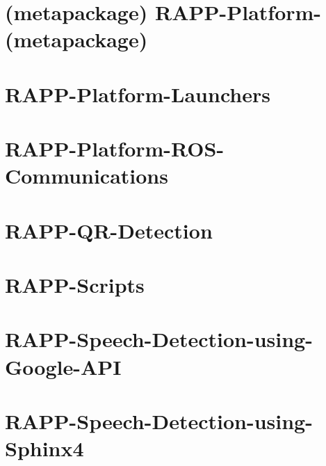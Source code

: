 \documentclass[twoside]{book}
\begin{document}
\chapter{(metapackage) R\-A\-P\-P-\/\-Platform-\/(metapackage)}
\label{md_rapp-platform_8wiki_RAPP-Platform-}
\hypertarget{md_rapp-platform_8wiki_RAPP-Platform-}{}

\chapter{R\-A\-P\-P-\/\-Platform-\/\-Launchers}
\label{md_rapp-platform_8wiki_RAPP-Platform-Launchers}
\hypertarget{md_rapp-platform_8wiki_RAPP-Platform-Launchers}{}

\chapter{R\-A\-P\-P-\/\-Platform-\/\-R\-O\-S-\/\-Communications}
\label{md_rapp-platform_8wiki_RAPP-Platform-ROS-Communications}
\hypertarget{md_rapp-platform_8wiki_RAPP-Platform-ROS-Communications}{}

\chapter{R\-A\-P\-P-\/\-Q\-R-\/\-Detection}
\label{md_rapp-platform_8wiki_RAPP-QR-Detection}
\hypertarget{md_rapp-platform_8wiki_RAPP-QR-Detection}{}

\chapter{R\-A\-P\-P-\/\-Scripts}
\label{md_rapp-platform_8wiki_RAPP-Scripts}
\hypertarget{md_rapp-platform_8wiki_RAPP-Scripts}{}

\chapter{R\-A\-P\-P-\/\-Speech-\/\-Detection-\/using-\/\-Google-\/\-A\-P\-I}
\label{md_rapp-platform_8wiki_RAPP-Speech-Detection-using-Google-API}
\hypertarget{md_rapp-platform_8wiki_RAPP-Speech-Detection-using-Google-API}{}

\chapter{R\-A\-P\-P-\/\-Speech-\/\-Detection-\/using-\/\-Sphinx4}
\label{md_rapp-platform_8wiki_RAPP-Speech-Detection-using-Sphinx4}
\hypertarget{md_rapp-platform_8wiki_RAPP-Speech-Detection-using-Sphinx4}{}

\end{document}
